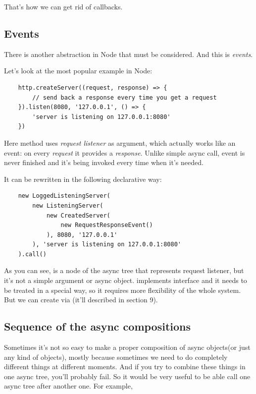 \documentclass{article}
\begin{document}
That's how we can get rid of callbacks.

\subsection{Events}

There is another abstraction in Node that must be considered. And this is \textit{events}.

Let's look at the most popular example in Node:

\begin{verbatim}
    http.createServer((request, response) => {
        // send back a response every time you get a request
    }).listen(8080, '127.0.0.1', () => {
        'server is listening on 127.0.0.1:8080'
    })
\end{verbatim}

Here method  uses \textit{request listener} as argument, which actually works like an event: on every \textit{request} it provides a  \textit{response}. Unlike simple async call, event is never finished and it's being invoked every time when it's needed.

It can be rewritten in the following declarative way:

\begin{verbatim}
    new LoggedListeningServer(
        new ListeningServer(
            new CreatedServer(
                new RequestResponseEvent()
            ), 8080, '127.0.0.1'
        ), 'server is listening on 127.0.0.1:8080'
    ).call()
\end{verbatim}

As you can see,  is a node of the async tree that represents request listener, but it's not a simple argument or async object.  implements  interface and it needs to be treated in a special way, so it requires more flexibility of the whole system. But we can create  via  (it'll described in section 9).

\subsection{Sequence of the async compositions}

Sometimes it's not so easy to make a proper composition of async objects(or just any kind of objects), mostly because sometimes we need to do completely different things at different moments. And if you try to combine these things in one async tree, you'll probably fail. So it would be very useful to be able call one async tree after another one. For example,
\end{document}
